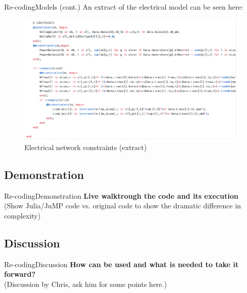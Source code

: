 \documentclass[handout]{beamer}
\begin{document}
\begin{frame}[t]{Re-coding}{Models (cont.)}
  An extract of the electrical model can be seen here:

  \begin{figure}
  \begin{center}
  \includegraphics[height=0.55\textheight]{OPF2.png}
  \end{center}
  \caption{Electrical network constraints (extract)}\label{fig:opf}
  \end{figure}

\end{frame}


\subsection{Demonstration}

  \begin{frame}{Re-coding}{Demonstration}
    \textbf{Live walktrough the code and its execution}\\[12pt]
    (Show Julia/JuMP code vs. original code to show the dramatic difference in complexity)
  \end{frame}

\subsection{Discussion}
\begin{frame}{Re-coding}{Discussion}
  \textbf{How can be used and what is needed to take it forward?}\\[12pt]
  (Discussion by Chris, ask him for some points here.)

\end{frame}
\end{document}
